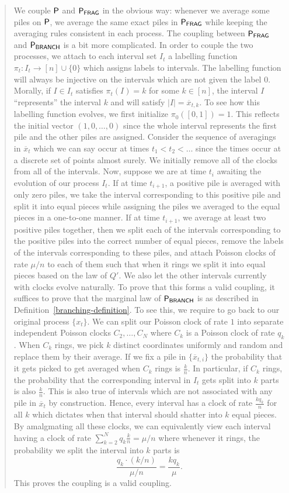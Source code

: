 \documentclass[12pt]{article}
\begin{document}
\begin{quote}
	We couple $\mathsf{P}$ and $\mathsf{P}_{\mathsf{FRAG}}$ in the obvious way: whenever we average some piles on $\mathsf{P}$, we average the same exact piles in $\mathsf{P}_{\mathsf{FRAG}}$ while keeping the averaging rules consistent in each process. The coupling between $\mathsf{P}_{\mathsf{FRAG}}$ and $\mathsf{P}_{\mathsf{BRANCH}}$ is a bit more complicated. In order to couple the two processes, we attach to each interval set $I_t$ a labelling function $\pi_t : I_t \to [n] \cup \{0\}$ which assigns labels to intervals. The labelling function will always be injective on the intervals which are not given the label $0$. Morally, if $I \in I_t$ satisfies $\pi_t(I) = k$ for some $k \in [n]$, the interval $I$ ``represents'' the interval $k$ and will satisfy $|I| = \overline{x}_{t, k}$. To see how this labelling function evolves, we first initialize $\pi_0([0, 1]) = 1$. This reflects the initial vector $(1, 0, \ldots, 0)$ since the whole interval represents the first pile and the other piles are assigned. Consider the sequence of averagings in $\overline{x}_t$ which we can say occur at times $t_1 < t_2 < \ldots$ since the times occur at a discrete set of points almost surely. We initially remove all of the clocks from all of the intervals. Now, suppose we are at time $t_i$ awaiting the evolution of our process $I_t$. If at time $t_{i+1}$, a positive pile is averaged with only zero piles, we take the interval corresponding to this positive pile and split it into equal pieces while assigning the piles we averaged to the equal pieces in a one-to-one manner. If at time $t_{i+1}$, we average at least two positive piles together, then we split each of the intervals corresponding to the positive piles into the correct number of equal pieces, remove the labels of the intervals corresponding to these piles, and attach Poisson clocks of rate $\mu / n$ to each of them such that when it rings we split it into equal pieces based on the law of $Q'$. We also let the other intervals currently with clocks evolve naturally. To prove that this forms a valid coupling, it suffices to prove that the marginal law of $\mathsf{P}_{\mathsf{BRANCH}}$ is as described in Definition~\ref{branching-definition}. To see this, we require to go back to our original process $\{x_t\}$. We can split our Poisson clock of rate $1$ into separate independent Poisson clocks $C_2, \ldots, C_N$ where $C_k$ is a Poisson clock of rate $q_k$. When $C_k$ rings, we pick $k$ distinct coordinates uniformly and random and replace them by their average. If we fix a pile in $\{\overline{x}_{t, i}\}$ the probability that it gets picked to get averaged when $C_k$ rings is $\frac{k}{n}$. In particular, if $C_k$ rings, the probability that the corresponding interval in $I_t$ gets split into $k$ parts is also $\frac{k}{n}$. This is also true of intervals which are not associated with any pile in $\overline{x}_t$ by construction. Hence, every interval has a clock of rate $\frac{kq_k}{n}$ for all $k$ which dictates when that interval should shatter into $k$ equal pieces. By amalgmating all these clocks, we can equivalently view each interval having a clock of rate $\sum_{k = 2}^N q_k \frac{k}{n} = \mu / n$ where whenever it rings, the probability we split the interval into $k$ parts is 
	\[
		\frac{q_k \cdot (k/n)}{\mu / n} = \frac{kq_k}{\mu}.
	\]
	This proves the coupling is a valid coupling. 
\end{quote}
\end{document}
